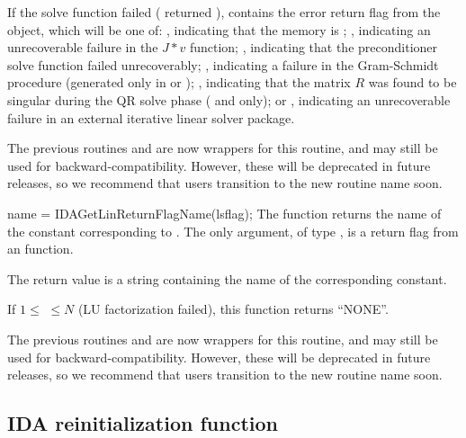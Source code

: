 {{  If the {\idals} solve function failed ( returned
  ),  contains the error return flag from
  the {\sunlinsol} object, which will be one of:
  , indicating that the {\sunlinsol} memory is ;
  , indicating an unrecoverable failure in the
  $J*v$ function;
  , indicating that the preconditioner solve
  function  failed unrecoverably;
  , indicating a failure in the Gram-Schmidt
  procedure (generated only in {\spgmr} or {\spfgmr});
  , indicating that the matrix $R$ was found to be
  singular during the QR solve phase ({\spgmr} and {\spfgmr} only); or
  , indicating an unrecoverable
  failure in an external iterative linear solver package.

  The previous routines  and
   are now wrappers for this routine, and may
  still be used for backward-compatibility.  However, these will be
  deprecated in future releases, so we recommend that users transition
  to the new routine name soon.
}
{
  name = IDAGetLinReturnFlagName(lsflag);
}
{
  The function  returns the
  name of the {\idals} constant corresponding to .
}
{
  The only argument, of type , is a return flag from an
  {\idals} function.
}
{
  The return value is a string containing the name of the corresponding
  constant.

  If $1 \leq $  $ \leq N$ (LU factorization failed), this
  function returns ``NONE''.
}
{
  The previous routines  and
   are now wrappers for this routine, and may
  still be used for backward-compatibility.  However, these will be
  deprecated in future releases, so we recommend that users transition
  to the new routine name soon.
}




\subsection{IDA reinitialization function}\label{sss:idareinit}

}
